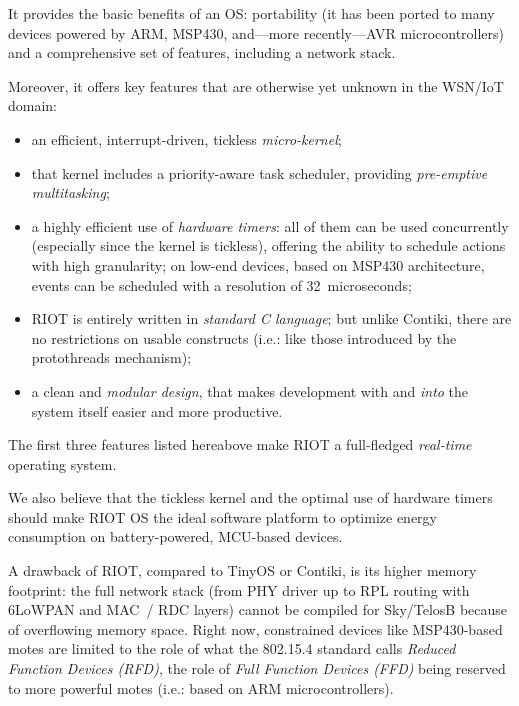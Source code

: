 \documentclass[a4paper,twoside]{article}
\begin{document}
It provides the basic benefits of an OS: portability (it has been ported
to many devices powered by ARM, MSP430, and---more recently---AVR
microcontrollers) and a comprehensive set of features, including
a network stack.

Moreover, it offers key features that are otherwise yet unknown in
the WSN/IoT domain:

\begin{itemize}

\item an efficient, interrupt-driven, tickless \emph{micro-kernel};

\item that kernel includes a priority-aware task scheduler, providing
      \emph{pre-emptive multitasking};

\item a highly efficient use of \emph{hardware timers}: all of them can be
      used concurrently (especially since the kernel is tickless), offering
      the ability to schedule actions with high granularity; on low-end
      devices, based on MSP430 architecture, events can be scheduled
      with a resolution of 32~microseconds;

\item RIOT is entirely written in \emph{standard C language}; but unlike
      Contiki, there are no restrictions on usable constructs (i.e.: like
      those introduced by the protothreads mechanism);

\item a clean and \emph{modular design}, that makes development with and
      \emph{into} the system itself easier and more productive.

\end{itemize}

The first three features listed hereabove make RIOT a full-fledged
\emph{real-time} operating system.

We also believe that the tickless kernel and the optimal use of hardware
timers should make RIOT OS the ideal software platform to optimize energy
consumption on battery-powered, MCU-based devices.

A drawback of RIOT, compared to TinyOS or Contiki, is its higher memory
footprint: the full network stack (from PHY driver up to RPL routing with
\mbox{6LoWPAN} and MAC~/ RDC layers) cannot be compiled for Sky/TelosB
because of overflowing memory space. Right now, constrained devices like
MSP430-based motes are limited to the role of what the 802.15.4 standard
calls \emph{Reduced Function Devices (RFD)}, the role of \emph{Full
Function Devices (FFD)} being reserved to more powerful motes (i.e.:
based on ARM microcontrollers).
\end{document}
